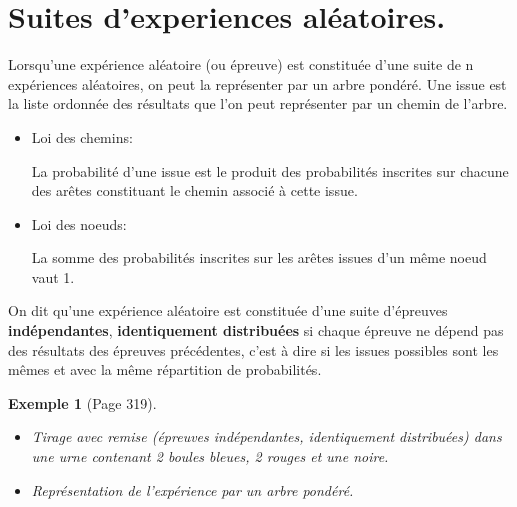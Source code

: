 \documentclass[a4paper,11pt]{article}
\theoremstyle{break}
\newcounter{enonce}
\newtheorem{exemple}[enonce]{Exemple}
\begin{document}
  \newpage

    \section{Suites d'experiences aléatoires.} 
    

  \begin{theorem}
      Lorsqu'une expérience aléatoire (ou épreuve) est 
      constituée d'une suite de n expériences aléatoires, 
      on peut la représenter par un arbre pondéré. 
      Une issue est la liste ordonnée des résultats que l'on peut 
      représenter par un chemin de l'arbre.
      
      \begin{itemize}
      
      \item Loi des chemins:
       
       La probabilité d'une issue est le produit des 
       probabilités inscrites sur chacune des arêtes
       constituant le chemin associé à cette issue.
       
       \item Loi des noeuds:
       
       La somme des probabilités inscrites sur les arêtes
       issues d'un même noeud vaut 1.
       
       
      \end{itemize}

   \end{theorem}
   
      \begin{definition}
   On dit qu'une expérience aléatoire est constituée d'une suite d'épreuves \textbf{indépendantes},
   \textbf{identiquement distribuées} si chaque épreuve ne dépend pas des résultats des épreuves 
   précédentes, c'est à dire si les issues possibles sont les mêmes et avec la même répartition
   de probabilités.
  \end{definition}
 
 
  
    \begin{exemple}[Page 319]
   
   \begin{itemize}
    \item Tirage avec remise (épreuves indépendantes, identiquement distribuées)
    dans une urne contenant 2 boules bleues, 2 rouges et une noire.

  \item Représentation de l'expérience par un arbre pondéré.

   \end{itemize}
  \end{exemple}
\end{document}
